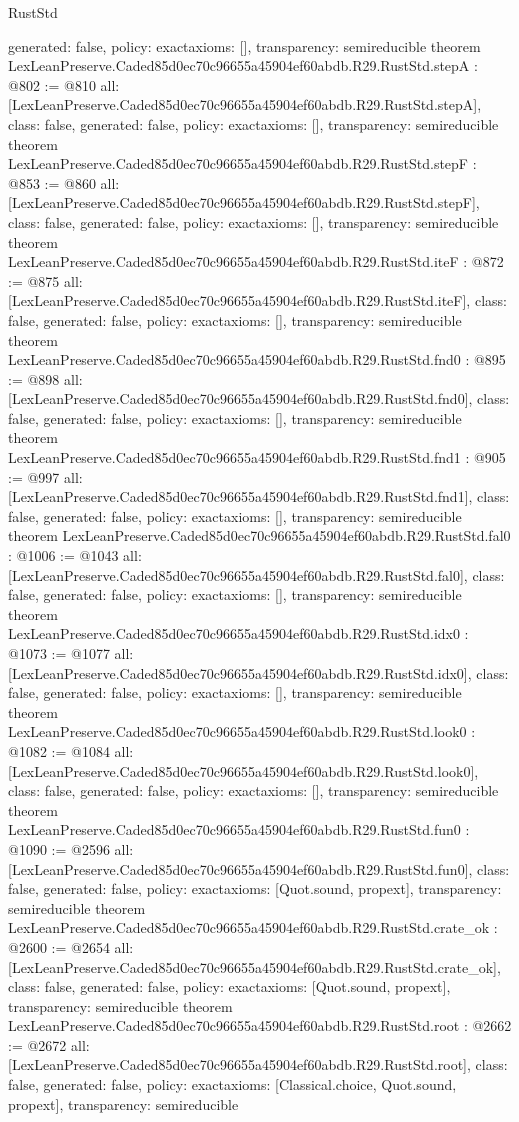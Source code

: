 \begin{lexlean}{RustStd}
\begin{coremodule}
{  generated: false,
  policy: exact{axioms: []},
  transparency: semireducible
}
theorem LexLeanPreserve.Caded85d0ec70c96655a45904ef60abdb.R29.RustStd.stepA : @802 := @810 {
  all: [LexLeanPreserve.Caded85d0ec70c96655a45904ef60abdb.R29.RustStd.stepA],
  class: false,
  generated: false,
  policy: exact{axioms: []},
  transparency: semireducible
}
theorem LexLeanPreserve.Caded85d0ec70c96655a45904ef60abdb.R29.RustStd.stepF : @853 := @860 {
  all: [LexLeanPreserve.Caded85d0ec70c96655a45904ef60abdb.R29.RustStd.stepF],
  class: false,
  generated: false,
  policy: exact{axioms: []},
  transparency: semireducible
}
theorem LexLeanPreserve.Caded85d0ec70c96655a45904ef60abdb.R29.RustStd.iteF : @872 := @875 {
  all: [LexLeanPreserve.Caded85d0ec70c96655a45904ef60abdb.R29.RustStd.iteF],
  class: false,
  generated: false,
  policy: exact{axioms: []},
  transparency: semireducible
}
theorem LexLeanPreserve.Caded85d0ec70c96655a45904ef60abdb.R29.RustStd.fnd0 : @895 := @898 {
  all: [LexLeanPreserve.Caded85d0ec70c96655a45904ef60abdb.R29.RustStd.fnd0],
  class: false,
  generated: false,
  policy: exact{axioms: []},
  transparency: semireducible
}
theorem LexLeanPreserve.Caded85d0ec70c96655a45904ef60abdb.R29.RustStd.fnd1 : @905 := @997 {
  all: [LexLeanPreserve.Caded85d0ec70c96655a45904ef60abdb.R29.RustStd.fnd1],
  class: false,
  generated: false,
  policy: exact{axioms: []},
  transparency: semireducible
}
theorem LexLeanPreserve.Caded85d0ec70c96655a45904ef60abdb.R29.RustStd.fal0 : @1006 := @1043 {
  all: [LexLeanPreserve.Caded85d0ec70c96655a45904ef60abdb.R29.RustStd.fal0],
  class: false,
  generated: false,
  policy: exact{axioms: []},
  transparency: semireducible
}
theorem LexLeanPreserve.Caded85d0ec70c96655a45904ef60abdb.R29.RustStd.idx0 : @1073 := @1077 {
  all: [LexLeanPreserve.Caded85d0ec70c96655a45904ef60abdb.R29.RustStd.idx0],
  class: false,
  generated: false,
  policy: exact{axioms: []},
  transparency: semireducible
}
theorem LexLeanPreserve.Caded85d0ec70c96655a45904ef60abdb.R29.RustStd.look0 : @1082 := @1084 {
  all: [LexLeanPreserve.Caded85d0ec70c96655a45904ef60abdb.R29.RustStd.look0],
  class: false,
  generated: false,
  policy: exact{axioms: []},
  transparency: semireducible
}
theorem LexLeanPreserve.Caded85d0ec70c96655a45904ef60abdb.R29.RustStd.fun0 : @1090 := @2596 {
  all: [LexLeanPreserve.Caded85d0ec70c96655a45904ef60abdb.R29.RustStd.fun0],
  class: false,
  generated: false,
  policy: exact{axioms: [Quot.sound, propext]},
  transparency: semireducible
}
theorem LexLeanPreserve.Caded85d0ec70c96655a45904ef60abdb.R29.RustStd.crate_ok : @2600 := @2654 {
  all: [LexLeanPreserve.Caded85d0ec70c96655a45904ef60abdb.R29.RustStd.crate_ok],
  class: false,
  generated: false,
  policy: exact{axioms: [Quot.sound, propext]},
  transparency: semireducible
}
theorem LexLeanPreserve.Caded85d0ec70c96655a45904ef60abdb.R29.RustStd.root : @2662 := @2672 {
  all: [LexLeanPreserve.Caded85d0ec70c96655a45904ef60abdb.R29.RustStd.root],
  class: false,
  generated: false,
  policy: exact{axioms: [Classical.choice, Quot.sound, propext]},
  transparency: semireducible
}


\end{coremodule}
\end{lexlean}
